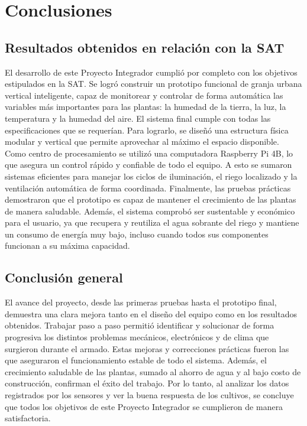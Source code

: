\chapter*{Conclusiones}

\section*{Resultados obtenidos en relación con la SAT}

El desarrollo de este Proyecto Integrador cumplió por completo con los objetivos estipulados en la SAT. Se logró construir un prototipo funcional de granja urbana vertical inteligente, capaz de monitorear y controlar de forma automática las variables más importantes para las plantas: la humedad de la tierra, la luz, la temperatura y la humedad del aire.  El sistema final cumple con todas las especificaciones que se requerían. Para lograrlo, se diseñó una estructura física modular y vertical que permite aprovechar al máximo el espacio disponible. Como centro de procesamiento se utilizó una computadora Raspberry Pi 4B, lo que asegura un control rápido y confiable de todo el equipo. A esto se sumaron sistemas eficientes para manejar los ciclos de iluminación, el riego localizado y la ventilación automática de forma coordinada.  Finalmente, las pruebas prácticas demostraron que el prototipo es capaz de mantener el crecimiento de las plantas de manera saludable. Además, el sistema comprobó ser sustentable y económico para el usuario, ya que recupera y reutiliza el agua sobrante del riego y mantiene un consumo de energía muy bajo, incluso cuando todos sus componentes funcionan a su máxima capacidad.

\section*{Conclusión general}

El avance del proyecto, desde las primeras pruebas hasta el prototipo final, demuestra una clara mejora tanto en el diseño del equipo como en los resultados obtenidos. Trabajar paso a paso permitió identificar y solucionar de forma progresiva los distintos problemas mecánicos, electrónicos y de clima que surgieron durante el armado. Estas mejoras y correcciones prácticas fueron las que aseguraron el funcionamiento estable de todo el sistema.  Además, el crecimiento saludable de las plantas, sumado al ahorro de agua y al bajo costo de construcción, confirman el éxito del trabajo. Por lo tanto, al analizar los datos registrados por los sensores y ver la buena respuesta de los cultivos, se concluye que todos los objetivos de este Proyecto Integrador se cumplieron de manera satisfactoria.

